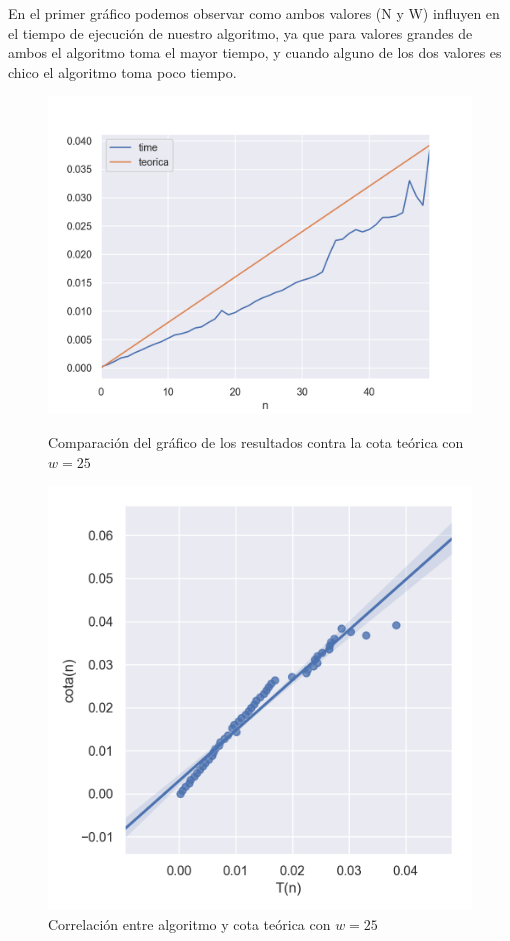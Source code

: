 En el primer gráfico podemos observar como ambos valores (N y W) influyen en el tiempo de ejecución de nuestro algoritmo, ya que para valores grandes de ambos el algoritmo toma el mayor tiempo, y cuando alguno de los dos valores es chico el algoritmo toma poco tiempo.

\begin{figure}[!htb]
   \begin{minipage}{0.5\textwidth}
     \centering
     \includegraphics[width=1\linewidth]{img/fijo_w_1}
     \caption{Comparación del gráfico de los resultados contra la cota teórica con $w=25$}
   \end{minipage}\hfill
   \begin{minipage}{0.5\textwidth}
     \centering
     \includegraphics[width=1\linewidth]{img/fijo_w_2}
     \caption{Correlación entre algoritmo y cota teórica con $w=25$}
   \end{minipage}
\end{figure}
